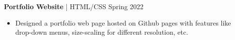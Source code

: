 \documentclass[12pt]{article}       %
\begin{document}
\textbf{Portfolio Website} | HTML/CSS \hfill Spring 2022 \\
\vspace{-9pt}
\begin{itemize}
    \item Designed a portfolio web page hosted on Github pages with features like drop-down menus, size-scaling for different resolution, etc.

\end{itemize}

\vspace{-18.5pt}
\end{document}
